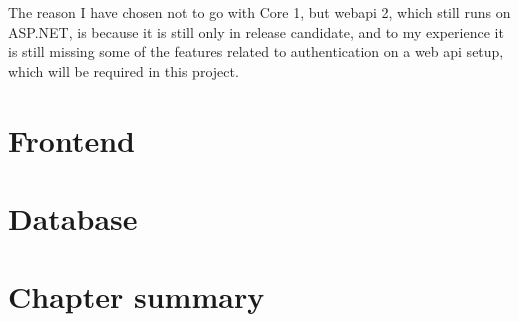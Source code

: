 The reason I have chosen not to go with Core 1, but webapi 2, which still runs on ASP.NET, is because it is still only in release candidate\cite{asp_core_1:roadmap}, and to my experience it is still missing some of the features related to authentication on a web api setup, which will be required in this project.

\section{Frontend}
\label{sec:Frontend}


\section{Database }
\label{sec:Database_engine}


\section{Chapter summary }
